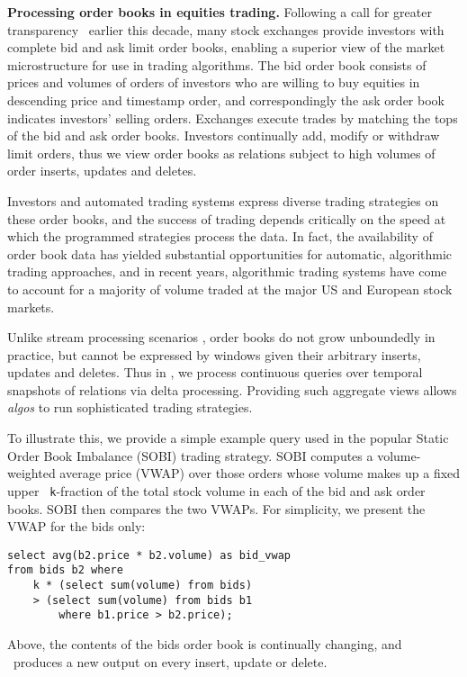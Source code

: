\medskip


\textbf{Processing order books in equities trading.}  Following a call for
greater transparency~\cite{sec-orderbook:00} earlier this decade, many stock
exchanges provide investors with complete bid and ask limit order books,
enabling a superior view of the market microstructure for use in trading
algorithms. The bid order book consists of prices and volumes of orders of
investors who are willing to buy equities in descending price and timestamp
order, and correspondingly the ask order book indicates investors' selling
orders. Exchanges execute trades by matching the tops of the bid and ask order
books. Investors continually add, modify or withdraw limit orders, thus we view
order books as relations subject to high volumes of order inserts, updates and
deletes.

Investors and automated trading systems express diverse trading strategies on
these order books, and the success of trading depends critically on the speed at
which the programmed strategies process the data.  In fact, the availability of
order book data has yielded substantial opportunities for automatic, algorithmic
trading approaches, and in recent years, algorithmic trading systems have come
to account for a majority of volume traded at the major US and European stock
markets.

Unlike stream processing scenarios \cite{abadi-vldbj:03,motwani-cidr:03}, order
books do not grow unboundedly in practice, but cannot be expressed by windows
given their arbitrary inserts, updates and deletes. Thus in \compiler, we
process continuous queries over temporal snapshots of relations via delta
processing.  Providing such aggregate views allows {\em algos}\/ to run
sophisticated trading strategies. 

To illustrate this, we provide a simple example query used in the popular Static
Order Book Imbalance (SOBI) trading strategy. SOBI computes a volume-weighted
average price (VWAP) over those orders whose volume makes up a fixed upper {\tt
k}-fraction of the total stock volume in each of the bid and ask order
books. SOBI then compares the two VWAPs. For simplicity, we present the VWAP for
the bids only:

\begin{Verbatim}
select avg(b2.price * b2.volume) as bid_vwap
from bids b2 where
    k * (select sum(volume) from bids)
    > (select sum(volume) from bids b1
        where b1.price > b2.price);
\end{Verbatim}
%
Above, the contents of the bids order book is continually changing, and
\compiler\ produces a new output on every insert, update or delete.


